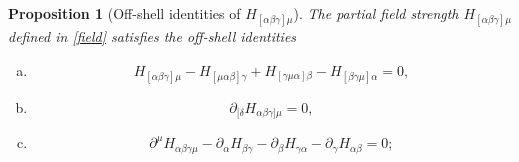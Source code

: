 \documentclass[a4paper,12pt]{article}
\newtheorem{Proposition}[Theorem]{Proposition}
\begin{document}
\begin{Proposition}[Off-shell identities of $H_{[\alpha\beta\gamma]\mu}$]
The partial field strength $H_{[\alpha\beta\gamma]\mu}$ defined in \eqref{field}
satisfies the off-shell identities 
    \begin{enumerate}[(a)]
        \item \begin{equation}
H_{[\alpha\beta\gamma]\mu}
- H_{[\mu\alpha\beta]\gamma}
+ H_{[\gamma\mu\alpha]\beta}
- H_{[\beta\gamma\mu]\alpha}
=0 ,
\label{lemma1}
\end{equation}
\item \begin{equation}
    \partial_{[\delta} H_{\alpha\beta\gamma]\mu} = 0,
\label{bianchi}
\end{equation}
\item \begin{equation}
    \partial^{\mu} H_{\alpha\beta\gamma\mu}
- \partial_{\alpha} H_{\beta\gamma}
- \partial_{\beta} H_{\gamma\alpha}
- \partial_{\gamma} H_{\alpha\beta}
= 0;
\label{bianchicon}
\end{equation}
\end{enumerate}
\end{Proposition}
\end{document}
